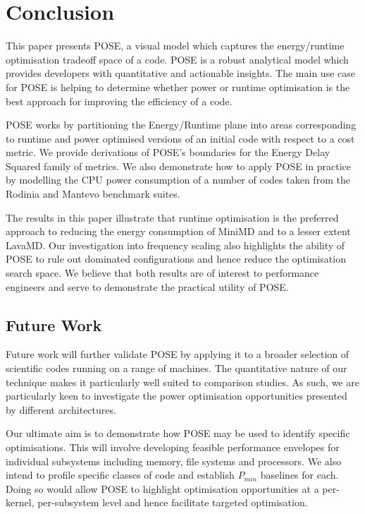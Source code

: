 \section{Conclusion}
\label{sec:conclusion}
This paper presents POSE, a visual model which captures the energy/runtime optimisation tradeoff space of a code.
POSE is a robust analytical model which provides developers with quantitative and actionable insights.
The main use case for POSE is helping to determine whether power or runtime optimisation is the best approach for improving the efficiency of a code.

POSE works by partitioning the Energy/Runtime plane into areas corresponding to runtime and power optimised versions of an initial code with respect to a cost metric.
We provide derivations of POSE's boundaries for the Energy Delay Squared family of metrics.
We also demonstrate how to apply POSE in practice by modelling the CPU power consumption of a number of codes taken from the Rodinia and Mantevo benchmark suites.  

The results in this paper illustrate that runtime optimisation is the preferred approach to reducing the energy consumption of MiniMD and to a lesser extent LavaMD.
Our investigation into frequency scaling also highlights the ability of POSE to rule out dominated configurations and hence reduce the optimisation search space.
We believe that both results are of interest to performance engineers and serve to demonstrate the practical utility of POSE.

\subsection{Future Work}
Future work will further validate POSE by applying it to a broader selection of scientific codes running on a range of machines.
The quantitative nature of our technique makes it particularly well suited to comparison studies.
As such, we are particularly keen to investigate the power optimisation opportunities presented by different architectures.

Our ultimate aim is to demonstrate how POSE may be used to identify specific optimisations.
This will involve developing feasible performance envelopes for individual subsystems including memory, file systems and processors. 
We also intend to profile specific classes of code and establish $P_{min}$ baselines for each.
Doing so would allow POSE to highlight optimisation opportunities at a per-kernel, per-subsystem level and hence facilitate targeted optimisation.
